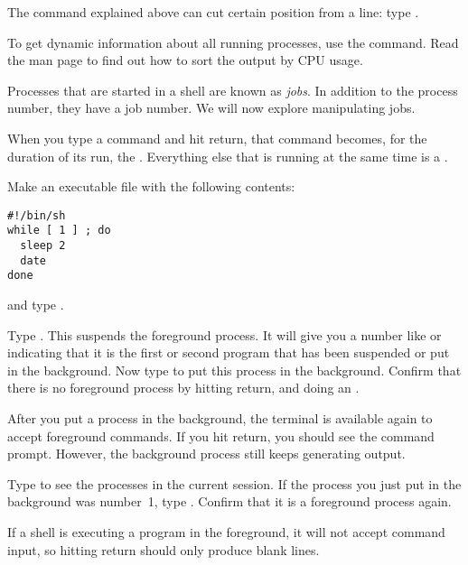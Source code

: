 The  command
explained above can
cut certain position from a line: type .

To get dynamic information about all running processes, use the
 command. Read the man page to find out how to sort the output
by CPU usage.

Processes that are started in a shell are known as
\emph{jobs}.
In addition to the process number, they have a job number.
We will now explore manipulating jobs.

When you type a command and hit return, that command becomes, for
the duration of its run, the .
Everything else that is running at the same time is a
.

Make an executable file  with the following contents:
\begin{lstlisting}
#!/bin/sh
while [ 1 ] ; do
  sleep 2
  date
done
\end{lstlisting}
and type . 

\begin{exercise}
  Type . This suspends the foreground process. It will
  give you a number like \n{[1]} or \n{[2]} indicating that it is the
  first or second program that has been suspended or put in the
  background. Now type  to put this process in the
  background. Confirm that there is no foreground process by hitting
  return, and doing an .
\end{exercise}
\begin{outcome}
  After you put a process in the background, the terminal is available
  again to accept foreground commands. If you hit return, you should
  see the command prompt. However, the background process still keeps
  generating output.
\end{outcome}

\begin{exercise}
  Type  to see the processes in the current session. If the
  process you just put in the background was number~1,
  type . Confirm that it is a foreground process again.
\end{exercise}
\begin{outcome}
  If a shell is executing a program in the foreground, it will not
  accept command input, so hitting return should only produce blank
  lines.
\end{outcome}

